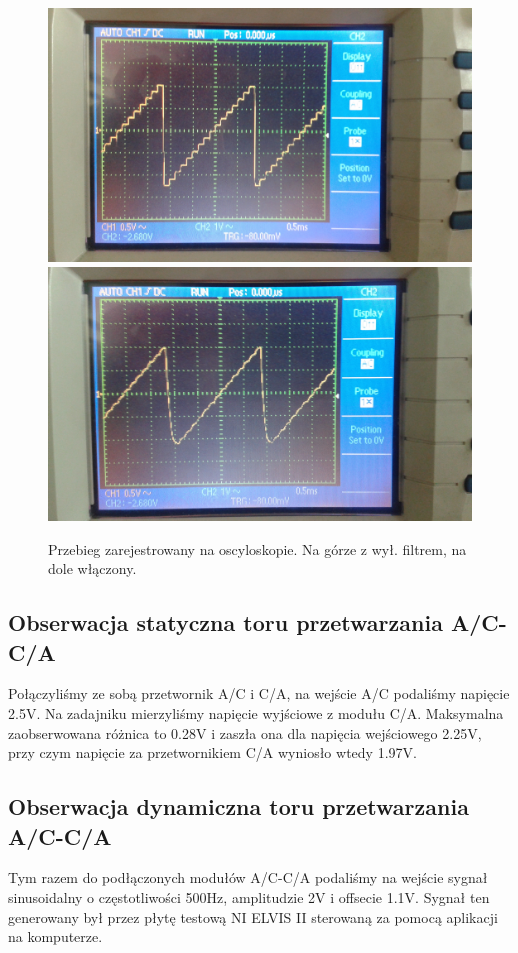 \documentclass{article}
\begin{document}
\begin{figure}[h!]
	\centering
	\includegraphics[scale=0.1]{img3}
	\includegraphics[scale=0.1]{img4}
	\caption{Przebieg zarejestrowany na oscyloskopie. Na górze z wył. filtrem, na dole włączony.}
\end{figure}

\subsection{Obserwacja statyczna toru przetwarzania A/C-C/A}
Połączyliśmy ze sobą przetwornik A/C i C/A, na wejście A/C podaliśmy napięcie 2.5V. Na zadajniku mierzyliśmy
napięcie wyjściowe z modułu C/A. Maksymalna zaobserwowana różnica to 0.28V i zaszła ona dla napięcia wejściowego 2.25V, przy czym napięcie za przetwornikiem C/A wyniosło wtedy 1.97V.

\subsection{Obserwacja dynamiczna toru przetwarzania A/C-C/A}
Tym razem do podłączonych modułów A/C-C/A podaliśmy na wejście sygnał sinusoidalny o częstotliwości 500Hz, amplitudzie 2V i offsecie 1.1V. Sygnał ten generowany był przez płytę testową NI ELVIS II sterowaną za pomocą aplikacji na komputerze.
\end{document}
